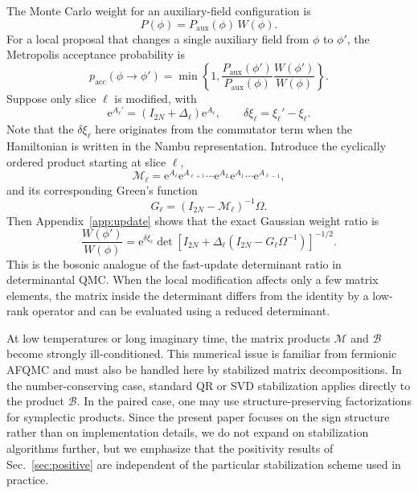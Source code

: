 \documentclass[twocolumn,aps,prb,10pt,amsmath,amssymb,amsthm,superscriptaddress]{revtex4-2}
\newcommand{\ee}{\mathrm{e}}
\newcommand{\mc}[1]{\mathcal{#1}}
\theoremstyle{remark}
\begin{document}
The Monte Carlo weight for an auxiliary-field configuration is
\begin{equation}
    P(\phi) = P_{\mathrm{aux}}(\phi)\,W(\phi).
\end{equation}
For a local proposal that changes a single auxiliary field from $\phi$ to $\phi'$, the Metropolis acceptance probability is
\begin{equation}
    p_{\mathrm{acc}}(\phi\to\phi') =
    \min\!\left\{1,
    \frac{P_{\mathrm{aux}}(\phi')}{P_{\mathrm{aux}}(\phi)}
    \frac{W(\phi')}{W(\phi)}\right\}.
\end{equation}
Suppose only slice $\ell$ is modified, with
\begin{equation}
    \ee^{A_\ell'} = \left(I_{2N}+\Delta_\ell\right)\ee^{A_\ell},
    \qquad
    \delta\xi_\ell = \xi_\ell' - \xi_\ell.
    \label{eq:delta_def}
\end{equation}
Note that the $\delta\xi_\ell$ here originates from the commutator term when the Hamiltonian is written in the Nambu representation.
Introduce the cyclically ordered product starting at slice $\ell$,
\begin{equation}
    \mc M_\ell = \ee^{A_\ell}\ee^{A_{\ell+1}}\cdots \ee^{A_L}\ee^{A_1}\cdots \ee^{A_{\ell-1}},
\end{equation}
and its corresponding Green's function
\begin{equation}
    G_\ell = \left(I_{2N}-\mc M_\ell\right)^{-1}\Omega.
\end{equation}
Then Appendix~\ref{app:update} shows that the exact Gaussian weight ratio is
\begin{equation}
    \frac{W(\phi')}{W(\phi)}
    = \ee^{\delta\xi_\ell}
    \det\!\left[I_{2N}+\Delta_\ell\left(I_{2N}-G_\ell\Omega^{-1}\right)\right]^{-1/2}.
    \label{eq:update_ratio_main}
\end{equation}
This is the bosonic analogue of the fast-update determinant ratio in determinantal QMC. When the local modification affects only a few matrix elements, the matrix inside the determinant differs from the identity by a low-rank operator and can be evaluated using a reduced determinant.

At low temperatures or long imaginary time, the matrix products $\mc M$ and $\mc B$ become strongly ill-conditioned. This numerical issue is familiar from fermionic AFQMC and must also be handled here by stabilized matrix decompositions. In the number-conserving case, standard QR or SVD stabilization applies directly to the product $\mc B$. In the paired case, one may use structure-preserving factorizations for symplectic products. Since the present paper focuses on the sign structure rather than on implementation details, we do not expand on stabilization algorithms further, but we emphasize that the positivity results of Sec.~\ref{sec:positive} are independent of the particular stabilization scheme used in practice.
\end{document}
